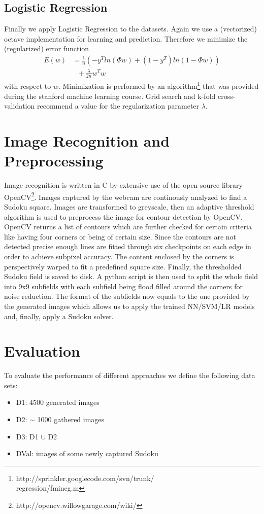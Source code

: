 \documentclass{article}
\begin{document}
\subsection{Logistic Regression}
Finally we apply Logistic Regression to the datasets. Again we use a (vectorized) octave implementation for learning and prediction. Therefore we minimize the (regularized) error function
\begin{align*}
E(w) &= \frac{1}{n}(-y^T ln(\Phi w) + (1-y^T)ln(1-\Phi w))\\
&~~~+\frac{\lambda}{2n}w^Tw
\end{align*}
with respect to $w$. Minimization is performed by an algorithm\footnote{http://sprinkler.googlecode.com/svn/trunk/\\regression/fmincg.m} that was provided during the stanford machine learning course. Grid search and k-fold cross-validation recommend a value for the regularization parameter $\lambda$.

\section{Image Recognition and Preprocessing}
Image recognition is written in C by extensive use of the open source library OpenCV\footnote{http://opencv.willowgarage.com/wiki/}. Images captured by the webcam are continously analyzed to find a Sudoku square. Images are transformed to greyscale, then an adaptive threshold algorithm is used to preprocess the image for contour detection by OpenCV. OpenCV returns a list of contours which are further checked for certain criteria like having four corners or being of certain size. Since the contours are not detected precise enough lines are fitted through six checkpoints on each edge in order to achieve subpixel accuracy. The content enclosed by the corners is perspectively warped to fit a predefined square size. Finally, the thresholded Sudoku field is saved to disk. A python script is then used to split the whole field into 9x9 subfields with each subfield being flood filled around the corners for noise reduction. The format of the subfields now equals to the one provided by the generated images which allows us to apply the trained NN/SVM/LR models and, finally, apply a Sudoku solver.

\section{Evaluation}
To evaluate the performance of different approaches we define the following data sets:
\begin{itemize}
\item D1: 4500 generated images
\item D2: $\sim$ 1000 gathered images
\item D3: D1 $\cup$ D2
\item DVal: images of some newly captured Sudoku
\end{itemize}
\end{document}

